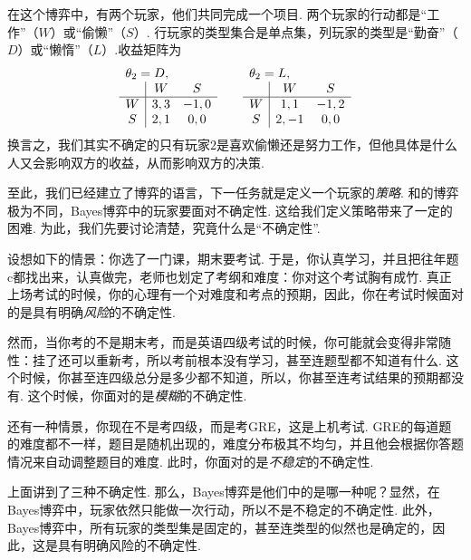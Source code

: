 \begin{example}[“工作还是偷懒”博弈]
    在这个博弈中，有两个玩家，他们共同完成一个项目. 两个玩家的行动都是“工作”（$W$）或“偷懒”（$S$）. 行玩家的类型集合是单点集，列玩家的类型是“勤奋”（$D$）或“懒惰”（$L$）.收益矩阵为
    \[\begin{array}{c|cc}
        \multicolumn{3}{l}{\theta_2=D,}\\
         &W&S  \\\hline
         W&3,3&-1,0\\
         S&2,1&0,0\\
    \end{array}\qquad \begin{array}{c|cc}
        \multicolumn{3}{l}{\theta_2=L,}\\
         &W&S  \\\hline
         W&1,1&-1,2\\
         S&2,-1&0,0\\
    \end{array}\]
    换言之，我们其实不确定的只有玩家$2$是喜欢偷懒还是努力工作，但他具体是什么人又会影响双方的收益，从而影响双方的决策. 
\end{example}

至此，我们已经建立了博弈的语言，下一任务就是定义一个玩家的\emph{策略}. 和的博弈极为不同，Bayes博弈中的玩家要面对不确定性. 这给我们定义策略带来了一定的困难. 为此，我们先要讨论清楚，究竟什么是“不确定性”. 

设想如下的情景：你选了一门课，期末要考试. 于是，你认真学习，并且把往年题c都找出来，认真做完，老师也划定了考纲和难度：你对这个考试胸有成竹. 真正上场考试的时候，你的心理有一个对难度和考点的预期，因此，你在考试时候面对的是具有明确\emph{风险}的不确定性. 

然而，当你考的不是期末考，而是英语四级考试的时候，你可能就会变得非常随性：挂了还可以重新考，所以考前根本没有学习，甚至连题型都不知道有什么. 这个时候，你甚至连四级总分是多少都不知道，所以，你甚至连考试结果的预期都没有. 这个时候，你面对的是\emph{模糊}的不确定性. 

还有一种情景，你现在不是考四级，而是考GRE，这是上机考试. GRE的每道题的难度都不一样，题目是随机出现的，难度分布极其不均匀，并且他会根据你答题情况来自动调整题目的难度. 此时，你面对的是\emph{不稳定}的不确定性. 

上面讲到了三种不确定性. 那么，Bayes博弈是他们中的是哪一种呢？显然，在Bayes博弈中，玩家依然只能做一次行动，所以不是不稳定的不确定性. 此外，Bayes博弈中，所有玩家的类型集是固定的，甚至连类型的似然也是确定的，因此，这是具有明确风险的不确定性. 

